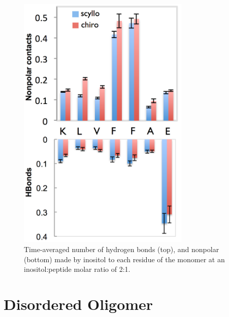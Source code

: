 \begin{figure}[ht]
\centering
\includegraphics[width=8.21cm]{figures/appendixA/inos2_figures_SI_monomerBinding.pdf}
\caption[Time-averaged number of hydrogen bonds and nonpolar made by inositol to each residue of the monomer at an inositol:peptide molar ratio of 2:1.]{Time-averaged number of hydrogen bonds (top), and nonpolar (bottom) made by inositol to each residue of the monomer at an inositol:peptide molar ratio of 2:1.}
\label{fig:SI-monomersBinding}
\end{figure}

\clearpage
\newpage

\section{Disordered Oligomer}


